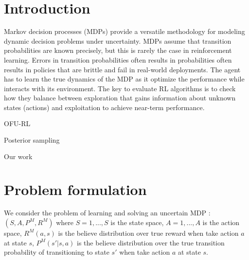 \documentclass{article}
\begin{document}
\section{Introduction}






Markov decision processes (MDPs) provide a versatile methodology for
modeling dynamic decision problems under uncertainty. MDPs assume that
transition probabilities are known precisely, but this is rarely the
case in reinforcement learning. Errors in transition probabilities
often results in probabilities often results in policies that are
brittle and fail in real-world deployments. The agent has to learn the
true dynamics of the MDP as it optimize the performance while
interacts with its environment. The key to evaluate RL algorithms is
to check how they balance between exploration that gains information
about unknown states (actions) and exploitation to  achieve near-term
performance. 


OFU-RL

Posterior sampling

Our work


\section{Problem formulation}

We consider the problem of learning and solving an uncertain
MDP :$(S, A, P^M, R^M)$ where $S = {1,...,S}$ is the state space, $A =
{1,...,A}$ is the action space, $R^M(a,s)$ is the believe distribution over
true reward when take action $a$ at state $s$, $P^M(s'|s,a)$ is the
believe distribution over the true transition probability of
transitioning to state $s'$ when take action $a$ at state $s$.
\end{document}
